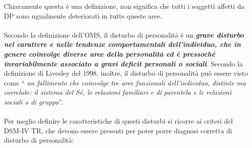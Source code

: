 Chiaramente questa è una definizione, non significa che tutti i soggetti
affetti da DP sono ugualmente deteriorati in tutte queste aree.
\\\\
Secondo la definizione dell'OMS, il disturbo di personalità è un
\textbf{\emph{grave disturbo nel carattere e nelle tendenze
comportamentali dell'individuo, che in genere coinvolge diverse aree
della personalità ed è pressoché invariabilmente associato a gravi
deficit personali o sociali}}. Secondo la definizione di Livesley del
1998, inoltre, il disturbo di personalità può essere visto come ``
\emph{un fallimento che coinvolge tre aree funzionali dell'individuo,
distinte ma correlate: il sistema del Sé, le relazioni familiari e di
parentela e le relazioni sociali o di gruppo}''.
\\\\
Per meglio definire le caratteristiche di questi disturbi si ricorre ai
criteri del DSM-IV TR, che devono essere presenti per poter porre
diagnosi corretta di disturbo di personalità:

